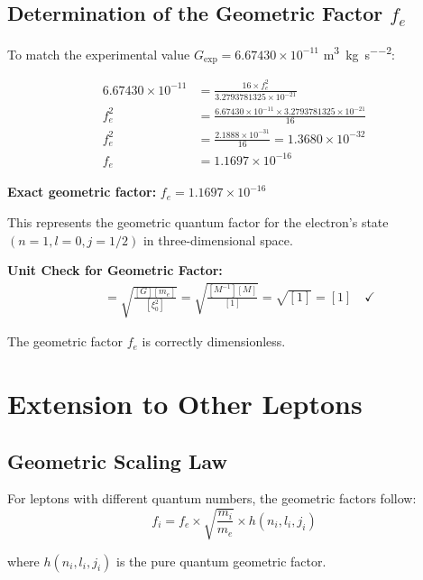\documentclass[12pt,a4paper]{article}
\theoremstyle{definition}
\begin{document}
	\subsection{Determination of the Geometric Factor $f_e$}
	
	To match the experimental value $G_{\text{exp}} = 6.67430 \times 10^{-11}$ \si{\metre\cubed\per\kilogram\per\second\squared}:
	
	\begin{align}
		6.67430 \times 10^{-11} &= \frac{16 \times f_e^2}{3.2793781325 \times 10^{-21}}\\
		f_e^2 &= \frac{6.67430 \times 10^{-11} \times 3.2793781325 \times 10^{-21}}{16}\\
		f_e^2 &= \frac{2.1888 \times 10^{-31}}{16} = 1.3680 \times 10^{-32}\\
		f_e &= 1.1697 \times 10^{-16}
	\end{align}
	
	\begin{important}
		\textbf{Exact geometric factor:} $f_e = 1.1697 \times 10^{-16}$
		
		This represents the geometric quantum factor for the electron's state $(n=1, l=0, j=1/2)$ in three-dimensional space.
	\end{important}
	
	 
		\textbf{Unit Check for Geometric Factor:}
		\begin{align}
			[f_e] &= \sqrt{\frac{[G][m_e]}{[\xi_0^2]}} = \sqrt{\frac{[M^{-1}][M]}{[1]}} = \sqrt{[1]} = [1] \quad \checkmark
		\end{align}
		
		The geometric factor $f_e$ is correctly dimensionless.
	 
	
	\section{Extension to Other Leptons}
	
	\subsection{Geometric Scaling Law}
	
	For leptons with different quantum numbers, the geometric factors follow:
	\begin{equation}
		f_i = f_e \times \sqrt{\frac{m_i}{m_e}} \times h(n_i, l_i, j_i)
	\end{equation}
	
	where $h(n_i, l_i, j_i)$ is the pure quantum geometric factor.
	
\end{document}
